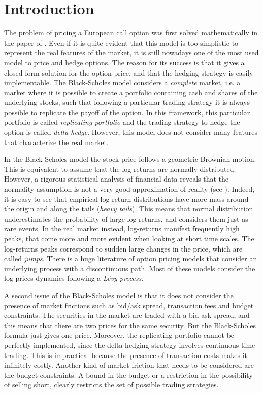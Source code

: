 

\chapter{Introduction}\label{Introd}
\minitoc%


\vspace{5em}

The problem of pricing a European call option was first solved mathematically in the paper of \cite{BS73}. 
Even if it is quite evident that this model is too simplistic to represent the real features of the market, it is 
still nowadays one of the most used model to price and hedge options.
The reason for its success is that it gives a closed form solution for the option price, and that the hedging strategy is easily 
implementable.
The Black-Scholes model considers a \emph{complete} market, i.e. a market where it is possible to create a portfolio containing cash 
and shares of the underlying stocks, such that following a particular trading strategy it is always possible to replicate
the payoff of the option. In this framework, this particular portfolio is called \emph{replicating portfolio} and
the trading strategy to hedge the option is called \emph{delta hedge}.
However, this model does not consider many features that characterize the real market. 

In the Black-Scholes model 
the stock price follows a geometric Brownian motion. This is equivalent to assume that the log-returns are 
normally distributed. 
However, a rigorous statistical analysis of financial data
reveals that the normality assumption is not a very good approximation of
reality (see \cite{Cont01}). Indeed, it is easy to see that empirical log-return distributions have
more mass around the origin and along the tails (\emph{heavy tails}).
This means that normal distribution underestimates the probability of large
log-returns, and considers them just as rare events. In the real market instead,
log-returns manifest frequently high peaks, that come more and more evident
when looking at short time scales. The log-returns peaks correspond to sudden
large changes in the price, which are called \emph{jumps}. 
There is a huge literature of option pricing models that consider an underlying process with a discontinuous path.
Most of these models consider the log-prices dynamics following a \emph{Lévy process}. 
 

A second issue of the Black-Scholes model is that it does not consider the presence of market frictions such as
bid/ask spread, transaction fees and budget constraints.
The securities in the market are traded with a bid-ask spread, and this means that there are two prices for the
same security. But the Black-Scholes formula just gives one price.
Moreover, the replicating portfolio cannot be perfectly implemented,
since the delta-hedging strategy involves continuous time trading. 
This is impractical because the presence of transaction costs makes it infinitely costly.
Another kind of market friction that needs to be considered are the budget constraints. 
A bound in the budget or a restriction in the possibility of 
selling short, clearly restricts the set of possible trading strategies.

